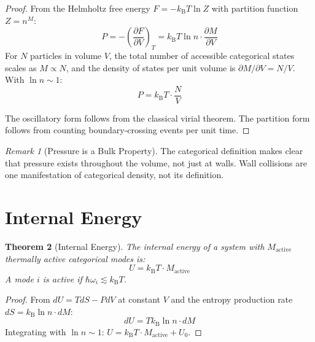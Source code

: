 \documentclass[twocolumn,10pt,a4paper]{article}
\theoremstyle{plain}
\newtheorem{theorem}{Theorem}[section]
\theoremstyle{definition}
\theoremstyle{remark}
\newtheorem{remark}[theorem]{Remark}
\newcommand{\kB}{k_{\mathrm{B}}}
\begin{document}
\begin{proof}
From the Helmholtz free energy $F = -\kB T \ln Z$ with partition function $Z = n^M$:
\begin{equation}
    P = -\left(\frac{\partial F}{\partial V}\right)_T = \kB T \ln n \cdot \frac{\partial M}{\partial V}
\end{equation}
For $N$ particles in volume $V$, the total number of accessible categorical states scales as $M \propto N$, and the density of states per unit volume is $\partial M/\partial V = N/V$. With $\ln n \sim 1$:
\begin{equation}
    P = \kB T \cdot \frac{N}{V}
\end{equation}

The oscillatory form follows from the classical virial theorem. The partition form follows from counting boundary-crossing events per unit time.
\end{proof}

\begin{remark}[Pressure is a Bulk Property]
The categorical definition makes clear that pressure exists throughout the volume, not just at walls. Wall collisions are one manifestation of categorical density, not its definition.
\end{remark}

\section{Internal Energy}
\label{sec:energy}

\begin{theorem}[Internal Energy]
\label{thm:energy}
The internal energy of a system with $M_{\mathrm{active}}$ thermally active categorical modes is:
\begin{equation}
    U = \kB T \cdot M_{\mathrm{active}}
\end{equation}
A mode $i$ is active if $\hbar\omega_i \lesssim \kB T$.
\end{theorem}

\begin{proof}
From $dU = TdS - PdV$ at constant $V$ and the entropy production rate $dS = \kB \ln n \cdot dM$:
\begin{equation}
    dU = T \kB \ln n \cdot dM
\end{equation}
Integrating with $\ln n \sim 1$: $U = \kB T \cdot M_{\mathrm{active}} + U_0$.
\end{proof}
\end{document}
